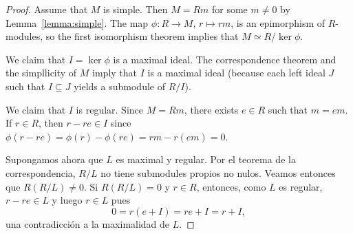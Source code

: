 \begin{proof}
	Assume that $M$ is simple. Then $M=Rm$ for some $m\ne0$ by 
	Lemma~\ref{lemma:simple}. The map $\phi\colon R\to M$, $r\mapsto rm$, 
	is an epimorphism of $R$-modules, so the first isomorphism theorem implies that 
	$M\simeq R/\ker\phi$. 
	
	We claim that $I=\ker\phi$ is a maximal ideal. The correspondence theorem 
	and the simpllicity of $M$ imply that $I$ is a maximal ideal (because each left ideal $J$ such that 
	$I\subseteq J$ yields a submodule of $R/I$).

	We claim that $I$ is regular. Since $M=Rm$, there exists $e\in R$ such that $m=em$. If
	$r\in R$, then $r-re\in I$ since 
	$\phi(r-re)=\phi(r)-\phi(re)=rm-r(em)=0$.

	Supongamos ahora que $L$ es maximal y regular.  Por el teorema de la
	correspondencia, $R/L$ no tiene submodules propios no nulos. Veamos
	entonces que $R(R/L)\ne0$. Si $R(R/L)=0$ y $r\in R$, entonces, como $L$ es
	regular, $r-re\in L$ y luego $r\in L$ pues 
	\[
	0=r(e+I)=re+I=r+I,
	\]
	una contradicción a la maximalidad de $L$.
\end{proof}


